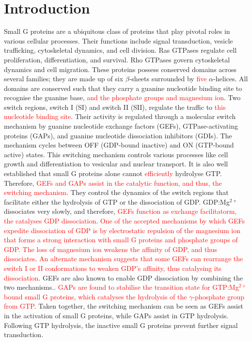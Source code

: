 \documentclass[12pt,a4paper]{achemso}
\begin{document}
\section{Introduction}
Small G proteins are a ubiquitous class of proteins that play pivotal roles in various cellular processes. Their functions include signal transduction, vesicle trafficking, cytoskeletal dynamics, and cell division. Ras GTPases regulate cell proliferation, differentiation, and survival. Rho GTPases govern cytoskeletal dynamics and cell migration.  These proteins possess conserved domains across several families; they are made up of six $\beta$-sheets surrounded by \textcolor{red}{five} $\alpha$-helices. All domains are conserved such that they carry a guanine nucleotide binding site to recognise the guanine base, \textcolor{red}{and the phosphate groups and magnesium ion}\cite{toma2019structural, cherfils2013regulation}. Two switch regions, switch I (SI) and switch II (SII), regulate the traffic to \textcolor{red}{this nucleotide binding site}. Their activity is regulated through a molecular switch mechanism by guanine nucleotide exchange factors (GEFs), GTPase-activating proteins (GAPs), and guanine nucleotide dissociation inhibitors (GDIs)\cite{cherfils2013regulation}. The mechanism cycles between OFF (GDP-bound inactive) and ON (GTP-bound active) states. This switching mechanism controls various processes like cell growth and differentiation to vesicular and nuclear transport\cite{cherfils2013regulation, loirand2013small}. It is also well established that small G proteins alone cannot \textcolor{red}{efficiently} hydrolyse GTP. Therefore,  \textcolor{red}{GEFs and GAPs assist in the catalytic function, and thus, the switching mechanism}. They control the dynamics of the switch regions that facilitate either the hydrolysis of GTP or the dissociation of GDP. GDP:Mg$^{2+}$ dissociates very slowly, and therefore, \textcolor{red}{GEFs function as exchange facilitatorm, the catalyses GDP dissociation}. \textcolor{red}{One of the accepted mechanisms by which GEFs expedite dissociation of GDP is by electrostatic repulsion of the magnesium ion that forms a strong interaction with small G proteins and phosphate groups of GDP. The loss of magnesium ion weakens the affinity of GDP, and thus dissociates}. \textcolor{red}{An alternate mechanism suggests that some GEFs can rearrange the switch I or II conformations to weaken GDP's affinity, thus catalysing its dissociation}.  GEFs are also known to enable GDP dissociation by combining the two mechanisms.\cite{cherfils1999gefs, cherfils2014gefs}. \textcolor{red}{GAPs are found to stabilise the transition state for GTP:Mg$^{2+}$ bound small G proteins, which catalyses the hydrolysis of the $\gamma$-phosphate group from GTP}. Taken together, the switching mechanism can be seen as GEFs assist in the activation of small G proteins, while GAPs assist in GTP hydrolysis. Following GTP hydrolysis, the inactive small G proteins prevent further signal transduction\cite{bos2007gefs}. 
\end{document}
